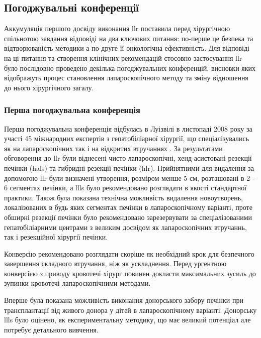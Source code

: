 \begin{refsection}
\subsection{Погоджувальні конференції}

Аккумуляція першого досвіду виконання \acrshort{llr} поставила перед хірургічною спільнотою завдання відповіді на два ключових питання: по-перше це безпека та відтворюваність методики а по-друге її онкологічна ефективність. Для відповіді на ці питання та створення клінічних рекомендацій стосовно застосування \acrshort{llr} було послідовно проведено декілька погоджувальних конференцій, висновки яких відображуть процес становлення лапароскопічного методу та зміну відношення до нього хірургічного загалу.

\subsubsection{Перша погоджувальна конференція} 
Перша погоджувальна конференція відбулась в Луізвілі в листопаді 2008 року за участі 45 міжнародних експертів з гепатобіліарної хірургії, що спеціалізувались як на лапароскопічних так і на відкритих втручаннях \cite{Buell2009}. За результатами обговорення до  \acrshort{llr} були віднесені чисто лапароскопічні, хенд-асистовані резекції печінки (\acrshort{hals}) та гибридні резекції печінки (\acrshort{hlr}). Прийнятними для видалення за допомогою  \acrshort{llr} були визначені утворення, розміром менше 5 см, розташовані в 2 - 6 сегментах печінки, а \acrshort{llls} було рекомендовано розглядати в якості стандартної практики. Також була показана технічна можливість видалення новоутворень, локалізованих в будь яких сегментах печінки в лапароскопічному варіанті, проте обширні резекції печінки було рекомендовано зарезервувати за спеціалізованими гепатобіліарними центрами з великим досвідом як лапароскопічних втручаннь, так і резекційної хірургії печінки. 

Конверсію рекомендовано розглядати скоріше як необхідний крок для безпечного завершення складного втручання, ніж як ускладнення. Перед ургентною конверсією з приводу кровотечі хірург повинен докласти максимальних зусиль до зупинки кровотечі лапароскопічними методами. 

Вперше була показана можливість виконання донорського забору печінки при трансплантації від живого донора у дітей в лапароскопічному варіанті. Донорську \acrshort{llls} було оцінено, як експериментальну методику, що має великий потенціал але потребує детального вивчення. 


\end{refsection}
